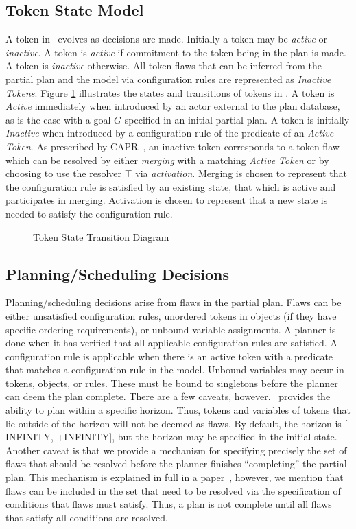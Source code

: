 \documentclass[10pt, letterpaper, twoside]{article}
\begin{document}
\subsection{Token State Model}
\label{token-state}
A token in \ET\, evolves as decisions are made.  Initially a token may be
{\em active} or {\em inactive}.  A token is {\em active} if commitment to
the token being in the plan is made.  A token is {\em inactive} otherwise. 
All token flaws that can be inferred from the partial plan and the model
via configuration rules are represented as {\em Inactive Tokens}. Figure
\ref{TokenStateTransition} illustrates the states and transitions of tokens
in \ET. A token is {\em Active} immediately when introduced by an actor
external to the plan database, as is the case with a goal $G$ specified in
an initial partial plan. A token is initially {\em Inactive} when
introduced by a configuration rule of the predicate of an {\em Active
Token}.  As prescribed by CAPR~\cite{europa2}, an inactive token corresponds to
a token flaw which can be resolved by either {\em merging} with a matching
{\em Active Token} or by choosing to use the resolver $\top$ via {\em
activation}. Merging is chosen to represent that the configuration rule is
satisfied by an existing state, that which is active and participates in
merging. Activation is chosen to represent that a new state is needed to
satisfy the configuration rule. 
\begin{figure}[t]
\centering{}
\caption{Token State Transition Diagram}
\label{TokenStateTransition}
\end{figure}

\subsection{Planning/Scheduling Decisions}
\label{decisions}
Planning/scheduling decisions arise from flaws in the partial plan.  Flaws
can be either unsatisfied configuration rules, unordered tokens in objects
(if they have specific ordering requirements), or unbound variable
assignments.  A planner is done when it has verified that all applicable
configuration rules are satisfied.  A configuration rule is applicable when
there is an active token with a predicate that matches a configuration rule
in the model.  Unbound variables may occur in tokens, objects, or rules.
These must be bound to singletons before the planner can deem the plan
complete.  There are a few caveats, however.  \ET\, provides the ability to
plan within a specific horizon.  Thus, tokens and variables of tokens that
lie outside of the horizon will not be deemed as flaws.  By default, the
horizon is [-INFINITY, +INFINITY], but the horizon may be specified in the
initial state. Another caveat is that we provide a mechanism for specifying
precisely the set of flaws that should be resolved before the planner
finishes ``completing'' the partial plan.  This mechanism is explained in
full in a paper~\cite{planid}, however, we mention that flaws can be
included in the set that need to be resolved via the specification of
conditions that flaws must satisfy.  Thus, a plan is not complete until all
flaws that satisfy all conditions are resolved.
\end{document}

